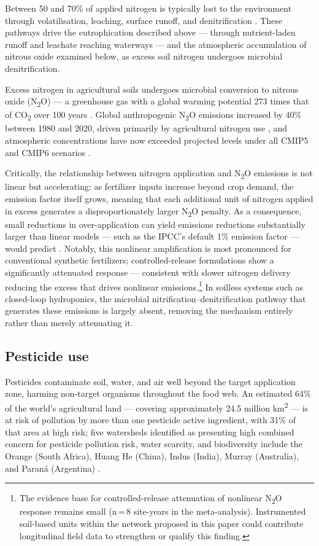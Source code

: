Between 50 and 70\% of applied nitrogen is typically lost to the environment through volatilisation, leaching, surface runoff, and denitrification \cite[p.~1]{coskun2017}. These pathways drive the eutrophication described above — through nutrient-laden runoff and leachate reaching waterways — and the atmospheric accumulation of nitrous oxide examined below, as excess soil nitrogen undergoes microbial denitrification.

Excess nitrogen in agricultural soils undergoes microbial conversion to nitrous oxide (N\textsubscript{2}O) — a greenhouse gas with a global warming potential 273 times that of CO\textsubscript{2} over 100 years \cite[Table~7.15]{Forster_AR6_Ch7_2021}. Global anthropogenic N\textsubscript{2}O emissions increased by 40\% between 1980 and 2020, driven primarily by agricultural nitrogen use \cite[Section~4.2.1]{Tian2024}, and atmospheric concentrations have now exceeded projected levels under all CMIP5 and CMIP6 scenarios \cite[Section~4.1.1]{Tian2024}.


Critically, the relationship between nitrogen application and N\textsubscript{2}O emissions is not linear but accelerating: as fertilizer inputs increase beyond crop demand, the emission factor itself grows, meaning that each additional unit of nitrogen applied in excess generates a disproportionately larger N\textsubscript{2}O penalty. As a consequence, small reductions in over-application can yield emissions reductions substantially larger than linear models — such as the IPCC's default 1\% emission factor — would predict \cite[pp.~9199--9202]{pnas1322434111}. Notably, this nonlinear amplification is most pronounced for conventional synthetic fertilizers; controlled-release formulations show a significantly attenuated response \cite[p.~9201]{pnas1322434111} — consistent with slower nitrogen delivery reducing the excess that drives nonlinear emissions.\footnote{The evidence base for controlled-release attenuation of nonlinear N\textsubscript{2}O response remains small (n\,=\,8 site-years in the meta-analysis). Instrumented soil-based units within the network proposed in this paper could contribute longitudinal field data to strengthen or qualify this finding.} In soilless systems such as closed-loop hydroponics, the microbial nitrification--denitrification pathway that generates these emissions is largely absent, removing the mechanism entirely rather than merely attenuating it.

\subsection{Pesticide use}\label{sec:pesticides}
Pesticides contaminate soil, water, and air well beyond the target
application zone, harming non-target organisms throughout the food web.
An estimated 64\% of the world's agricultural land --- covering approximately 24.5 million km\textsuperscript{2} --- is at risk of pollution by more than one pesticide active ingredient, with 31\% of that area at high risk; five watersheds identified as presenting high combined concern for pesticide pollution risk, water scarcity, and biodiversity include the Orange (South Africa), Huang He (China), Indus (India), Murray (Australia), and Paraná (Argentina) \cite[pp.~206--208]{Tang2021}.
 
